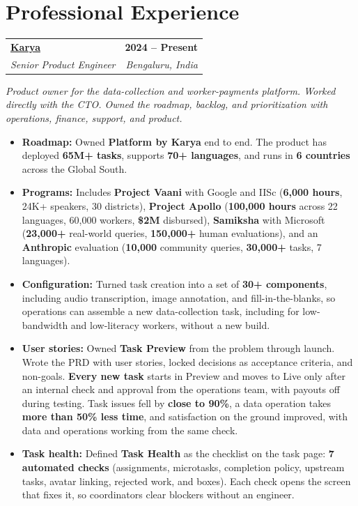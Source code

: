 \documentclass[letterpaper,10.5pt]{article}
\makeatletter
\newcommand{\entry}[4]{%
  \begin{tabularx}{\linewidth}{@{}X@{}r@{}}
    \textbf{#1} & \textbf{#4} \\
    \textit{#2} & \textit{#3} \\
  \end{tabularx}%
  \vspace{1pt}
}
\makeatother
\begin{document}
\section{Professional Experience}

\entry{\href{https://karya.in}{Karya}}{Senior Product Engineer}{Bengaluru, India}{2024 -- Present}
{\small\textit{Product owner for the data-collection and worker-payments platform. Worked directly with the CTO. Owned the roadmap, backlog, and prioritization with operations, finance, support, and product.}}
\begin{itemize}
  \item \textbf{Roadmap:} Owned \textbf{Platform by Karya} end to end. The product has deployed \textbf{65M+ tasks}, supports \textbf{70+ languages}, and runs in \textbf{6 countries} across the Global South.
  \item \textbf{Programs:} Includes \textbf{Project Vaani} with Google and IISc (\textbf{6,000 hours}, 24K+ speakers, 30 districts), \textbf{Project Apollo} (\textbf{100,000 hours} across 22 languages, 60,000 workers, \textbf{\$2M} disbursed), \textbf{Samiksha} with Microsoft (\textbf{23,000+} real-world queries, \textbf{150,000+} human evaluations), and an \textbf{Anthropic} evaluation (\textbf{10,000} community queries, \textbf{30,000+} tasks, 7 languages).
  \item \textbf{Configuration:} Turned task creation into a set of \textbf{30+ components}, including audio transcription, image annotation, and fill-in-the-blanks, so operations can assemble a new data-collection task, including for low-bandwidth and low-literacy workers, without a new build.
  \item \textbf{User stories:} Owned \textbf{Task Preview} from the problem through launch. Wrote the PRD with user stories, locked decisions as acceptance criteria, and non-goals. \textbf{Every new task} starts in Preview and moves to Live only after an internal check and approval from the operations team, with payouts off during testing. Task issues fell by \textbf{close to 90\%}, a data operation takes \textbf{more than 50\% less time}, and satisfaction on the ground improved, with data and operations working from the same check.
  \item \textbf{Task health:} Defined \textbf{Task Health} as the checklist on the task page: \textbf{7 automated checks} (assignments, microtasks, completion policy, upstream tasks, avatar linking, rejected work, and boxes). Each check opens the screen that fixes it, so coordinators clear blockers without an engineer.

\end{itemize}
\end{document}
